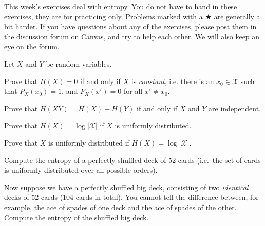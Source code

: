 \documentclass[a4paper,10pt,landscape,twocolumn]{scrartcl}
\begin{document}
\practiceproblems

{\sffamily\noindent
This week's exercises deal with entropy. You do not have to hand in these exercises, they are for practicing only. Problems marked with a $\bigstar$ are generally a bit harder. If you have questions about any of the exercises, please post them in the \href{https://canvas.uva.nl/courses/2205/discussion_topics/22949}{discussion forum on Canvas}, and try to help each other. We will also keep an eye on the forum.
}

\begin{exercise}
Let $X$ and $Y$ be random variables.
	\begin{subex}
	Prove that $H(X) = 0$ if and only if $X$ is \emph{constant}, i.e. there is an $x_0 \in \mathcal{X}$ such that $P_X(x_0) = 1$, and $P_X(x') = 0$ for all $x' \neq x_0$.
	\end{subex}
	
	\begin{subex}
	Prove that $H(XY) = H(X) + H(Y)$ if and only if $X$ and $Y$ are independent.
	\end{subex}

	\begin{subex}
	Prove that $H(X) = \log |\mathcal{X}|$ if $X$ is uniformly distributed.
	\end{subex}

	\begin{subex**}
	Prove that $X$ is uniformly distributed if $H(X) = \log |\mathcal{X}|$.
	\end{subex**}
	
\end{exercise}

\begin{exercise}
	\begin{subex}
	Compute the entropy of a perfectly shuffled deck of 52 cards (i.e.\ the set of cards is uniformly distributed over all possible orders).
	\end{subex}
	
	\begin{subex}
	Now suppose we have a perfectly shuffled big deck, consisting of two \emph{identical} decks of 52 cards (104 cards in total). You cannot tell the difference between, for example, the ace of spades of one deck and the ace of spades of the other. Compute the entropy of the shuffled big deck.
	\end{subex}
\end{exercise}
\end{document}
